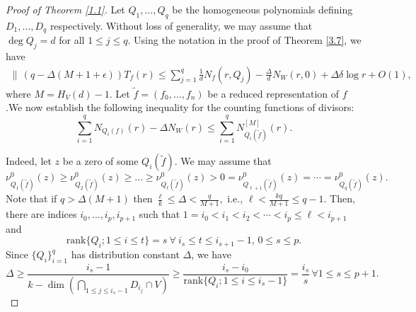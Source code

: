 \documentclass[12pt]{amsart}
\newcommand{\rank}{\mathrm{rank}}
\begin{document}
\begin{proof}[Proof of Theorem \ref{1.1}]
Let $Q_1,\ldots,Q_q$ be the homogeneous polynomials defining $D_1,\ldots,D_q$ respectively. Without loss of generality, we may assume that $\deg Q_j=d$ for all $1\le j\le q$.  Using the notation in the proof of Theorem \ref{3.7}, we have
\begin{align}\label{4}
\|\,(q-\Delta(M+1+\epsilon))T_f(r)\le\sum_{j=1}^q\frac{1}{ d}N_f(r,Q_j)-\frac{\Delta}{d}N_W(r,0)+\Delta\delta \log r + O(1),
\end{align}
where $M=H_V(d)-1.$ Let $\tilde f=(f_0,\ldots,f_n)$ be a reduced representation of $f$.We now establish the following inequality for the counting functions of divisors:
 $$\sum_{i=1}^qN_{Q_i(f)}(r)-\Delta N_{W}(r)\le \sum_{i=1}^qN^{[M]}_{Q_i(\tilde f)}(r).$$

Indeed, let $z$ be a zero of some $Q_i(\tilde f)$. We may assume that 
$$\nu^0_{Q_1(\tilde f)}(z)\ge \nu^0_{Q_2(\tilde f)}(z)\ge\ldots\ge\nu^0_{Q_\ell(\tilde f)}(z)>0=\nu^0_{Q_{\ell+1}(\tilde f)}(z)=\cdots=\nu^0_{Q_q(\tilde f)}(z).$$
Note that if $q>\Delta (M+1)$ then $\frac{\ell}{k}\le\Delta<\frac{q}{M+1},$ i.e., $\ell<\frac{kq}{M+1}\le q-1.$ Then, there are indices $i_0,\ldots,i_p,i_{p+1}$ such that $1=i_0<i_1<i_2<\cdots<i_p\le\ell<i_{p+1}$ and
$$\rank\{Q_i;1\le i\le t\}=s\ \forall\ i_{s}\le t\le i_{s+1}-1,\, 0\le s\le p.$$
Since $\{Q_i\}_{i=1}^q$ has distribution constant $\Delta$, we have 
$$\Delta\ge\frac{i_s-1}{k-\dim (\bigcap_{1\le j\le i_s-1}D_{i_j}\cap V)}\ge\frac{i_s-i_0}{\rank\{Q_i;1\le i\le i_s-1\}}=\frac{i_s}{s}\, \forall 1\le s\le p+1.$$


\end{proof}
\end{document}
